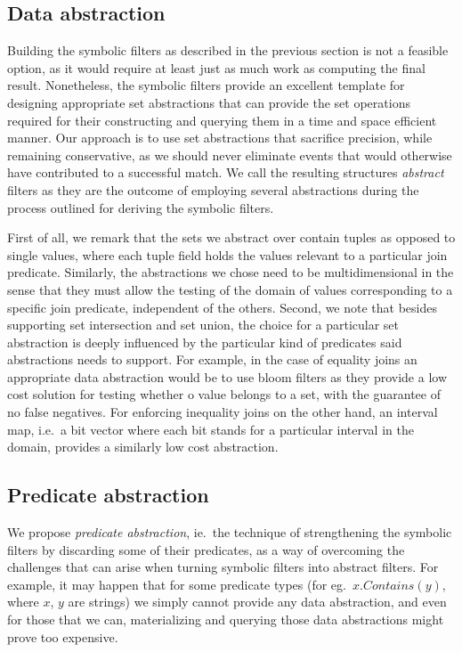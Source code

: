 \subsection{Data abstraction}
\label{sec:data_abstraction}


Building the symbolic filters as described in the previous section is not a 
feasible option, as it would require at least just as much work as computing 
the final result.
Nonetheless, the symbolic filters provide an excellent template for designing 
appropriate set abstractions that can provide the set operations required for 
their constructing and querying them in a time and space efficient manner. 
Our approach is to use set abstractions that sacrifice precision, while 
remaining conservative, as we should never eliminate events that would 
otherwise have contributed to a successful match.
We call the resulting structures {\em abstract} filters as they are the outcome 
of employing several abstractions during the process outlined for deriving the 
symbolic filters.  


First of all, we remark that the sets we abstract over contain tuples as 
opposed to single values, where each tuple field holds the values relevant to a 
particular join predicate. 
Similarly, the abstractions we chose need to be multidimensional in the sense 
that they must allow the testing of the domain of values corresponding to a 
specific join predicate, independent of the others.  
Second, we note that besides supporting set intersection and set union, the 
choice for a particular set abstraction is deeply influenced by the particular 
kind of predicates said abstractions needs to support.
For example, in the case of equality joins an appropriate data abstraction 
would be to use bloom filters as they provide a low cost solution for testing 
whether o value belongs to a set, with the guarantee of no false negatives.
For enforcing inequality joins on the other hand, an interval map, i.e.\ a 
bit vector where each bit stands for a particular interval in the domain,
provides a similarly low cost abstraction.  




\subsection{Predicate abstraction}
\label{sec:pred_abstraction}


We propose {\em predicate abstraction}, ie.\ the technique of strengthening
 the
symbolic filters by discarding some of their predicates, as a way of
 overcoming
the challenges that can arise when turning symbolic filters into abstract 
filters.
For example, it may happen that for some predicate types
(for eg.\ $x.Contains(y)$, where $x$, $y$ are strings) we simply cannot
 provide
any data abstraction, and even for those that we can, materializing and
 querying
those data abstractions might prove too expensive.

